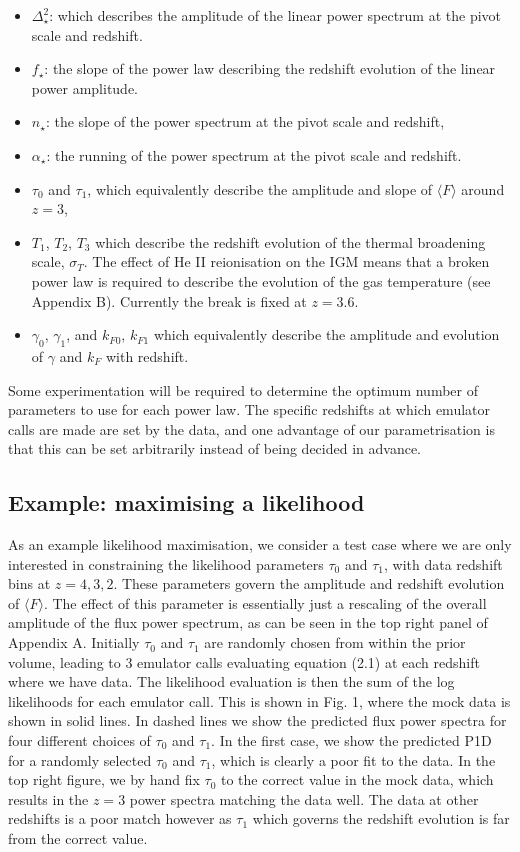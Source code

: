 \documentclass[]{article}
\begin{document}
\begin{itemize}
    \item $\Delta^2_\star$: which describes the amplitude of the linear power spectrum at 
    the pivot scale and redshift.
    \item $f_\star$: the slope of the power law describing the redshift evolution of the 
    linear power amplitude.
    \item $n_\star$: the slope of the power spectrum at the pivot scale and redshift,
    \item $\alpha_\star$: the running of the power spectrum at the pivot scale and redshift.
    \item  $\tau_0$ and $\tau_1$, which equivalently describe the amplitude and slope of $\langle F\rangle$ around $z=3$,
    \item  $T_1$, $T_2$, $T_3$ which describe the redshift evolution of the thermal 
    broadening scale, $\sigma_T$. The effect of He II reionisation on the IGM means that 
    a broken power law is required to describe the evolution of the gas temperature (see 
    Appendix B). Currently the break is fixed at $z=3.6$.
    \item $\gamma_0$, $\gamma_1$, and $k_{F0}$, $k_{F1}$ which equivalently describe the amplitude and evolution of $\gamma$ and $k_F$ with redshift.
\end{itemize}

\noindent Some experimentation will be required to determine the optimum number of 
parameters to use for each power law. The specific redshifts at which emulator calls are 
made are set by the data, and one advantage of our parametrisation is that this can be 
set arbitrarily instead of being decided in advance.

\subsection{Example: maximising a likelihood}
As an example likelihood maximisation, we consider a test case where we are only interested 
in constraining the likelihood parameters $\tau_0$ and $\tau_1$, with data redshift bins 
at $z=4,3,2$. These parameters govern the amplitude and redshift evolution of $\langle F\rangle$.
The effect of this parameter is essentially just a rescaling of the overall amplitude of the flux
power spectrum, as can be seen in the top right panel of Appendix A.
Initially $\tau_0$ and $\tau_1$ are randomly chosen from within the prior 
volume, leading to 3 emulator calls evaluating equation (2.1) at each redshift where we 
have data. The likelihood evaluation is then the sum of the log likelihoods for each 
emulator call. This is shown in Fig. 1, where the mock data is shown in solid lines.
In dashed lines we show the predicted flux power spectra for four different choices of
$\tau_0$ and $\tau_1$. In the first case, we show the predicted P1D for a randomly selected
$\tau_0$ and $\tau_1$, which is clearly a poor fit to the data. In the top right figure,
we by hand fix $\tau_0$ to the correct value in the mock data, which results in the
$z=3$ power spectra matching the data well. The data at other redshifts is a poor match
however as $\tau_1$ which governs the redshift evolution is far from the correct value.
\end{document}
